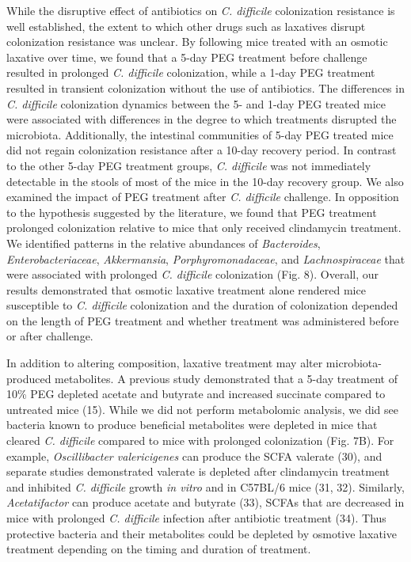 \documentclass[
  11pt,
]{article}
\begin{document}
While the disruptive effect of antibiotics on \emph{C. difficile}
colonization resistance is well established, the extent to which other
drugs such as laxatives disrupt colonization resistance was unclear. By
following mice treated with an osmotic laxative over time, we found that
a 5-day PEG treatment before challenge resulted in prolonged \emph{C.
difficile} colonization, while a 1-day PEG treatment resulted in
transient colonization without the use of antibiotics. The differences
in \emph{C. difficile} colonization dynamics between the 5- and 1-day
PEG treated mice were associated with differences in the degree to which
treatments disrupted the microbiota. Additionally, the intestinal
communities of 5-day PEG treated mice did not regain colonization
resistance after a 10-day recovery period. In contrast to the other
5-day PEG treatment groups, \emph{C. difficile} was not immediately
detectable in the stools of most of the mice in the 10-day recovery
group. We also examined the impact of PEG treatment after \emph{C.
difficile} challenge. In opposition to the hypothesis suggested by the
literature, we found that PEG treatment prolonged colonization relative
to mice that only received clindamycin treatment. We identified patterns
in the relative abundances of \emph{Bacteroides},
\emph{Enterobacteriaceae}, \emph{Akkermansia},
\emph{Porphyromonadaceae}, and \emph{Lachnospiraceae} that were
associated with prolonged \emph{C. difficile} colonization (Fig. 8).
Overall, our results demonstrated that osmotic laxative treatment alone
rendered mice susceptible to \emph{C. difficile} colonization and the
duration of colonization depended on the length of PEG treatment and
whether treatment was administered before or after challenge.

In addition to altering composition, laxative treatment may alter
microbiota-produced metabolites. A previous study demonstrated that a
5-day treatment of 10\% PEG depleted acetate and butyrate and increased
succinate compared to untreated mice (15). While we did not perform
metabolomic analysis, we did see bacteria known to produce beneficial
metabolites were depleted in mice that cleared \emph{C. difficile}
compared to mice with prolonged colonization (Fig. 7B). For example,
\emph{Oscillibacter valericigenes} can produce the SCFA valerate (30),
and separate studies demonstrated valerate is depleted after clindamycin
treatment and inhibited \emph{C. difficile} growth \emph{in vitro} and
in C57BL/6 mice (31, 32). Similarly, \emph{Acetatifactor} can produce
acetate and butyrate (33), SCFAs that are decreased in mice with
prolonged \emph{C. difficile} infection after antibiotic treatment (34).
Thus protective bacteria and their metabolites could be depleted by
osmotive laxative treatment depending on the timing and duration of
treatment.
\end{document}
